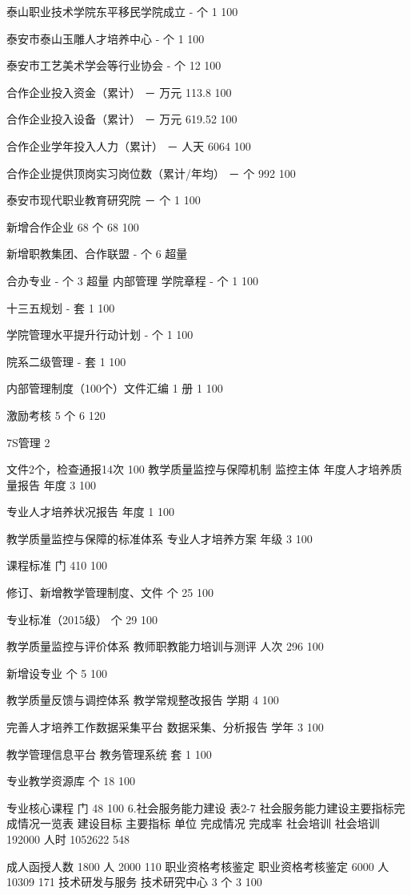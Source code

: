 泰山职业技术学院东平移民学院成立
-
个
1
100%

泰安市泰山玉雕人才培养中心
-
个
1
100%

泰安市工艺美术学会等行业协会
-
个
12
100%

合作企业投入资金（累计）
－
万元
113.8
100%

合作企业投入设备（累计）
－
万元
619.52
100%

合作企业学年投入人力（累计）
－
人天
6064
100%

合作企业提供顶岗实习岗位数（累计/年均）
－
个
992
100%

泰安市现代职业教育研究院
－
个
1
100%

新增合作企业
68
个
68
100%

新增职教集团、合作联盟
-
个
6
超量

合办专业
-
个
3
超量
内部管理
学院章程
-
个
1
100%

十三五规划
-
套
1
100%

学院管理水平提升行动计划
-
个
1
100%

院系二级管理
-
套
1
100%

内部管理制度（100个）文件汇编
1
册
1
100%

激励考核
5
个
6
120%

7S管理
2

文件2个，检查通报14次
100%
教学质量监控与保障机制
监控主体
年度人才培养质量报告
年度
3
100%


专业人才培养状况报告
年度
1
100%

教学质量监控与保障的标准体系
专业人才培养方案
年级
3
100%


课程标准
门
410
100%


修订、新增教学管理制度、文件
个
25
100%


专业标准（2015级）
个
29
100%

教学质量监控与评价体系
教师职教能力培训与测评
人次
296
100%


新增设专业
个
5
100%

教学质量反馈与调控体系
教学常规整改报告
学期
4
100%

完善人才培养工作数据采集平台
数据采集、分析报告
学年
3
100%

教学管理信息平台
教务管理系统
套
1
100%


专业教学资源库
个
18
100%


专业核心课程
门
48
100%
6.社会服务能力建设
表2-7  社会服务能力建设主要指标完成情况一览表
建设目标
主要指标
单位
完成情况
完成率
社会培训
社会培训
192000
人时
1052622
548%

成人函授人数
1800
人
2000
110%
职业资格考核鉴定
职业资格考核鉴定
6000
人
10309
171%
技术研发与服务
技术研究中心
3
个
3
100%

